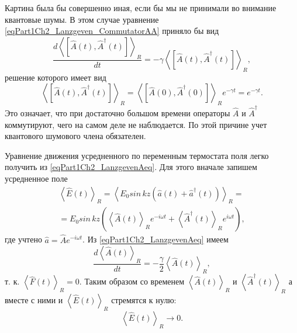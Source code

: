 Картина была бы совершенно иная, если бы мы не принимали во внимание
квантовые шумы. В этом случае уравнение
\eqref{eqPart1Ch2_Lanzgeven_CommutatorAA} приняло бы вид
\begin{equation}
\frac{d \left<\left[\hat{A}\left(t\right),\hat{A}^{\dag}\left(t\right)\right]\right>_R}{d
t}=
- \gamma \left<\left[\hat{A}\left(t\right),\hat{A}^{\dag}\left(t\right)\right]\right>_R,
\nonumber
\end{equation}
решение которого имеет вид
\begin{equation}
\left<\left[\hat{A}\left(t\right),\hat{A}^{\dag}\left(t\right)\right]\right>_R
= 
\left<\left[\hat{A}\left(0\right),\hat{A}^{\dag}\left(0\right)\right]\right>_R
e^{- \gamma t}= e^{- \gamma t}.
\nonumber
\end{equation}
Это означает, что при достаточно большом времени операторы $\hat{A}$ и
$\hat{A}^{\dag}$ коммутируют, чего на самом деле не наблюдается. По этой
причине учет квантового шумового члена обязателен.


Уравнение движения усредненного по переменным термостата поля легко
получить из \eqref{eqPart1Ch2_LanzgevenAeq}. Для этого вначале запишем
усредненное поле
\begin{eqnarray}
\left<\hat{E}\left(t\right)\right>_R 
= \left< E_0 sin\,kz \left( \hat{a}\left(t\right) +
\hat{a}^{\dag}\left(t\right)\right)\right>_R  = 
\nonumber \\
= E_0 sin\,kz
\left(\left<\hat{A}\left(t\right)\right>_R e^{-i \omega t}
+
\left<\hat{A}^{\dag}\left(t\right)\right>_R e^{i \omega t}
\right),
\nonumber
\end{eqnarray}
где учтено $\hat{a} = \hat{A}e^{-i \omega t}$. Из
\eqref{eqPart1Ch2_LanzgevenAeq} имеем 
\begin{equation}
\frac{d \left<\hat{A}\left(t\right)\right>_R}{d t} = 
- \frac{\gamma}{2} \left<\hat{A}\left(t\right)\right>_R,
\nonumber
\end{equation}
т. к. $\left<\hat{F}\left(t\right)\right>_R = 0$. Таким образом со
временем $\left<\hat{A}\left(t\right)\right>_R$ и
$\left<\hat{A}^{\dag}\left(t\right)\right>_R$ а вместе с ними и  
$\left<\hat{E}\left(t\right)\right>_R$ стремятся к нулю:
\begin{equation}
\left<\hat{E}\left(t\right)\right>_R \rightarrow 0.
\nonumber
\end{equation}

